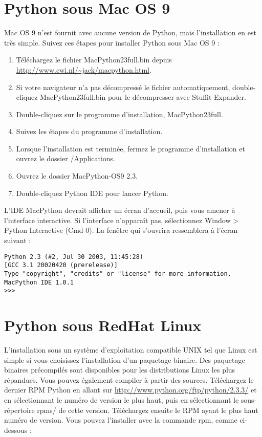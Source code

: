 \section{Python sous Mac OS 9}\label{Python sous Mac OS 9}

Mac OS 9 n'est fournit avec aucune version de Python, mais l'installation en est très simple. Suivez ces étapes pour installer Python sous Mac OS 9 :

\begin{enumerate}
    \item{Téléchargez le fichier MacPython23full.bin depuis \url{http://www.cwi.nl/~jack/macpython.html}.}
    \item{Si votre navigateur n'a pas décompressé le fichier automatiquement, double-cliquez MacPython23full.bin pour le décompresser avec Stuffit Expander.}
    \item{Double-cliquez sur le programme d'installation, MacPython23full.}
    \item{Suivez les étapes du programme d'installation.}
    \item{Lorsque l'installation est terminée, fermez le programme d'installation et  ouvrez le dossier /Applications.}
    \item{Ouvrez le dossier MacPython-OS9 2.3.}
    \item{Double-cliquez Python IDE pour lancer Python.}
\end{enumerate}

\medskip
L'IDE MacPython devrait afficher un écran d'accueil, puis vous amener à l'interface interactive. Si l'interface n'apparaît pas, sélectionnez Window > Python Interactive (Cmd-0). La fenêtre qui s'ouvrira ressemblera à l'écran suivant :

\begin{lstlisting}
Python 2.3 (#2, Jul 30 2003, 11:45:28)
[GCC 3.1 20020420 (prerelease)]
Type "copyright", "credits" or "license" for more information.
MacPython IDE 1.0.1
>>>
\end{lstlisting}

\section{Python sous RedHat Linux}\label{Python sous RedHat Linux}

L'installation sous un système d'exploitation compatible UNIX tel que Linux est simple si vous choisissez l'installation d'un paquetage binaire. Des paquetage binaires précompilés sont disponibles pour les distributions Linux les plus répandues. Vous pouvez également compiler à partir des sources.
Téléchargez le dernier RPM Python en allant sur \url{http://www.python.org/ftp/python/2.3.3/} et en sélectionnant le numéro de version le plus haut, puis en sélectionnant le sous-répertoire rpms/ de cette version. Téléchargez ensuite le RPM ayant le plus haut numéro de version. Vous pouvez l'installer avec la commande rpm, comme ci-dessous :

